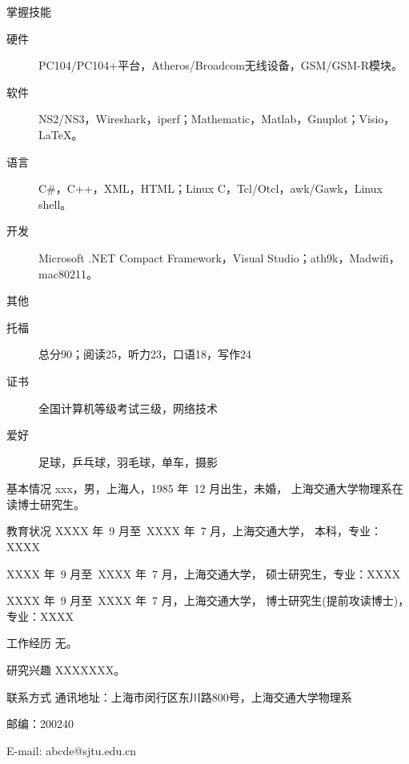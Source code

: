 \begin{resume}
\begin{resumesection}{掌握技能}
\begin{description}
  \item[硬件] PC104/PC104+平台，Atheros/Broadcom无线设备，GSM/GSM-R模块。
  \item[软件] NS2/NS3，Wireshark，iperf；Mathematic，Matlab，Gnuplot；Visio，\LaTeX。
  \item[语言] C\#，C++，XML，HTML；Linux C，Tcl/Otcl，awk/Gawk，Linux shell。
  \item[开发] Microsoft .NET Compact Framework，Visual Studio；ath9k，Madwifi，mac80211。
\end{description}
\end{resumesection}

\begin{resumesection}{其他}
\begin{description}
  \item[托福] 总分90；阅读25，听力23，口语18，写作24
  \item[证书] 全国计算机等级考试三级，网络技术
  \item[爱好] 足球，乒乓球，羽毛球，单车，摄影
\end{description}
\end{resumesection}

\begin{resumesection}{基本情况}
xxx，男，上海人，1985 年~12 月出生，未婚，
上海交通大学物理系在读博士研究生。
\end{resumesection}

\begin{resumelist}{教育状况}
XXXX 年~9 月至~XXXX 年~7 月，上海交通大学， 本科，专业：XXXX

XXXX 年~9 月至~XXXX 年~7 月，上海交通大学， 硕士研究生，专业：XXXX

XXXX 年~9 月至~XXXX 年~7 月，上海交通大学，
博士研究生(提前攻读博士)，专业：XXXX
\end{resumelist}

\begin{resumelist}{工作经历}
无。
\end{resumelist}

\begin{resumelist}{研究兴趣}
XXXXXXX。
\end{resumelist}

\begin{resumelist}{联系方式}
通讯地址：上海市闵行区东川路800号，上海交通大学物理系

邮编：200240

E-mail: abcde@sjtu.edu.cn
\end{resumelist}

\end{resume}
